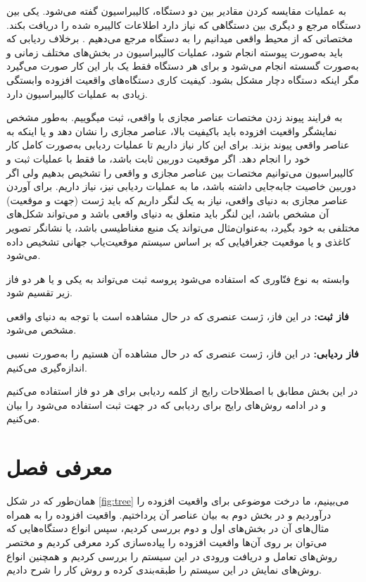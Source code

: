 به عملیات مقایسه کردن مقادیر بین دو دستگاه، کالیبراسیون گفته می‌شود. یکی بین دستگاه مرجع و دیگری بین دستگاهی که نیاز دارد اطلاعات کالیبره شده را دریافت بکند. مختصاتی که از محیط واقعی میدانیم را به دستگاه مرجع می‌دهیم  . برخلاف ردیابی که باید به‌صورت پیوسته انجام شود، عملیات کالیبراسیون در بخش‌های مختلف زمانی و به‌صورت گسسته انجام می‌شود و برای هر دستگاه فقط یک بار این کار صورت می‌گیرد مگر اینکه دستگاه دچار مشکل بشود. کیفیت کاری دستگاه‌های واقعیت افزوده وابستگی زیادی به عملیات کالیبراسیون دارد\cite{siltanen2012theory}.

به فرایند پیوند زدن مختصات عناصر مجازی با واقعی، ثبت میگوییم. به‌طور مشخص نمایشگر واقعیت افزوده باید باکیفیت بالا، عناصر مجازی را نشان دهد و یا اینکه به عناصر واقعی پیوند بزند. برای این کار نیاز داریم تا عملیات ردیابی به‌صورت کامل کار خود را انجام دهد. اگر موقعیت دوربین ثابت باشد، ما فقط با عملیات ثبت و کالیبراسیون می‌توانیم مختصات بین عناصر مجازی و واقعی را تشخیص بدهیم ولی اگر دوربین خاصیت جابه‌جایی داشته باشد، ما به عملیات ردیابی نیز، نیاز داریم\cite{siltanen2012theory}.
برای آوردن عناصر مجازی به دنیای واقعی، نیاز به یک لنگر داریم که باید ژست (جهت و موقعیت) آن مشخص باشد، این لنگر باید متعلق به دنیای واقعی باشد و می‌تواند شکل‌های مختلفی به خود بگیرد، به‌عنوان‌مثال می‌تواند یک منبع مغناطیسی باشد، یا نشانگر تصویر کاغذی و یا موقعیت جغرافیایی که بر اساس سیستم موقعیت‌یاب جهانی تشخیص داده می‌شود.

وابسته به نوع فنّاوری که استفاده می‌شود پروسه ثبت می‌تواند به یکی و یا هر دو فاز زیر تقسیم شود.


\textbf{فاز ثبت:}
در این فاز، ژست عنصری که در حال مشاهده است با توجه به دنیای واقعی مشخص می‌شود.

\textbf{فاز ردیابی:}
در این فاز، ژست عنصری که در حال مشاهده آن هستیم را به‌صورت نسبی اندازه‌گیری می‌کنیم.

در این بخش مطابق با اصطلاحات رایج از کلمه ردیابی برای هر دو فاز استفاده می‌کنیم و در ادامه روش‌های رایج برای ردیابی که در جهت ثبت استفاده می‌شود را بیان می‌کنیم.


\section{معرفی فصل}
همان‌طور که در شکل \ref{fig:tree} می‌بینیم، ما درخت موضوعی برای واقعیت افزوده را درآوردیم و در بخش دوم به بیان عناصر آن پرداختیم.
واقعیت افزوده را به همراه مثال‌های آن در بخش‌های اول و دوم بررسی کردیم، سپس انواع دستگاه‌هایی که می‌توان بر روی آن‌ها واقعیت افزوده را پیاده‌سازی کرد معرفی کردیم و مختصر روش‌های تعامل و دریافت ورودی در این سیستم را بررسی کردیم و همچنین انواع روش‌های نمایش در این سیستم را طبقه‌بندی کرده و روش کار را شرح دادیم.

